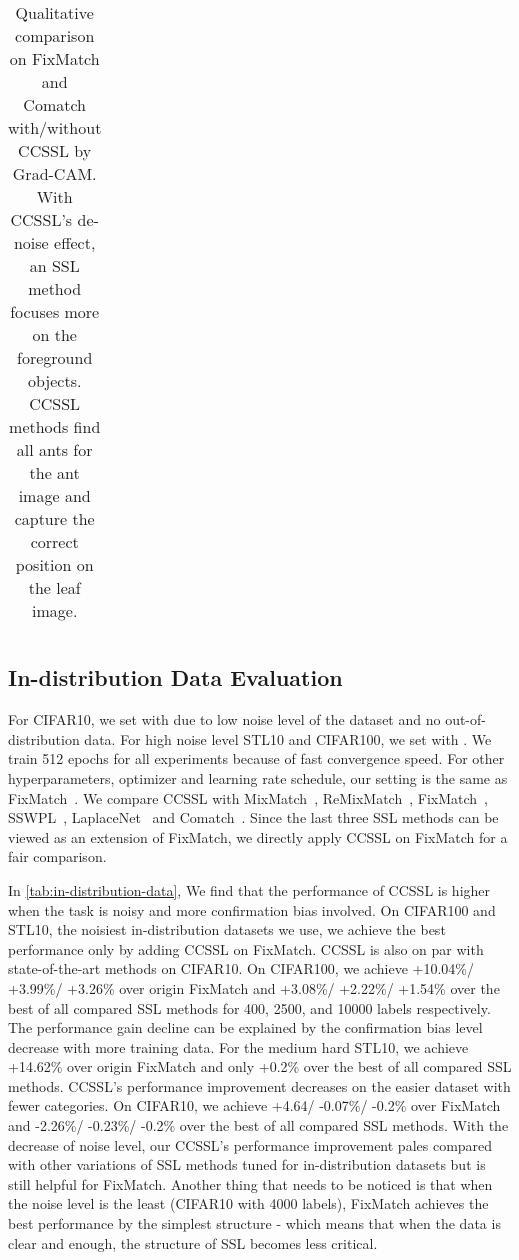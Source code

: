 \documentclass[10pt,twocolumn,letterpaper]{article}
\begin{document}
\begin{table}[t]
\begin{tabular}{p{}<{\centering}p{}<{\centering}p{}<{\centering}p{}<{\centering}p{}<{\centering}}
\bottomrule
\end{tabular}

\caption{Qualitative comparison on FixMatch and Comatch with/without CCSSL by Grad-CAM\cite{Grad-CAM}. With CCSSL's de-noise effect, an SSL method focuses more on the foreground objects. CCSSL methods find all ants for the ant image and capture the correct position on the leaf image.}
\label{tab:visulation}
\end{table}

\subsection{In-distribution Data Evaluation}
For CIFAR10, we set  with  due to low noise level of the dataset and no out-of-distribution data. For high noise level STL10 and CIFAR100, we set  with . We train 512 epochs for all experiments because of fast convergence speed. For other hyperparameters, optimizer and learning rate schedule, our setting is the same as FixMatch~\cite{sohn2020fixmatch}. We compare CCSSL with  MixMatch~\cite{berthelot2019mixmatch}, ReMixMatch~\cite{berthelot2019remixmatch}, FixMatch~\cite{sohn2020fixmatch}, SSWPL~\cite{taherkhani2021self}, LaplaceNet~\cite{sellars2021laplacenet} and Comatch~\cite{li2021comatch}. Since the last three SSL methods can be viewed as an extension of FixMatch, we directly apply CCSSL on FixMatch for a fair comparison. 

In \cref{tab:in-distribution-data}, We find that the performance of CCSSL is higher when the task is noisy and more confirmation bias involved. On CIFAR100 and STL10, the noisiest in-distribution datasets we use, we achieve the best performance only by adding CCSSL on FixMatch. CCSSL is also on par with state-of-the-art methods on CIFAR10. On CIFAR100, we achieve +10.04\%/ +3.99\%/ +3.26\% over origin FixMatch and +3.08\%/ +2.22\%/ +1.54\% over the best of all compared SSL methods for 400, 2500, and 10000 labels respectively. The performance gain decline can be explained by the confirmation bias level decrease with more training data. For the medium hard STL10, we achieve +14.62\% over origin FixMatch and only +0.2\% over the best of all compared SSL methods. CCSSL's performance improvement decreases on the easier dataset with fewer categories. On CIFAR10, we achieve +4.64/ -0.07\%/ -0.2\% over FixMatch and -2.26\%/ -0.23\%/ -0.2\% over the best of all compared SSL methods. With the decrease of noise level, our CCSSL's performance improvement pales compared with other variations of SSL methods tuned for in-distribution datasets but is still helpful for FixMatch. Another thing that needs to be noticed is that when the noise level is the least (CIFAR10 with 4000 labels), FixMatch achieves the best performance by the simplest structure - which means that when the data is clear and enough, the structure of SSL becomes less critical. 
\end{document}
